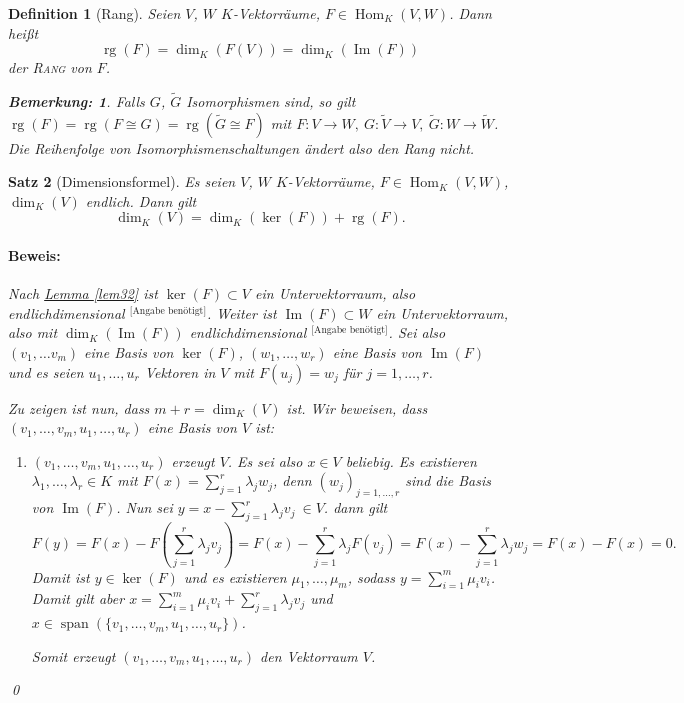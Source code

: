 \documentclass{report}
\newcommand{\IN}[1]{\index{#1|BH}}
\newcommand{\lb}{\lambda}
\DeclareMathOperator{\Span}{span}
\DeclareMathOperator{\Hom}{Hom}
\DeclareMathOperator{\Ima}{Im}
\DeclareMathOperator{\rg}{rg}
\theoremstyle{customrem}
\newtheorem*{bemerkung}{Bemerkung\textnormal:}
\theoremstyle{customdef}
\newtheorem{definition}{Definition}[chapter]
\newtheorem{satz}[definition]{Satz}
\renewenvironment{proof}{\paragraph{Beweis: }}{\qed}
\theoremstyle{customenv}
\newcommand{\defemph}[1]{\textsc{#1}}
\begin{document}
	\begin{definition}[Rang]
		\IN{Rang}
		Seien \(V\), \(W\) \(K\)-Vektorräume, \(F\in\Hom_K(V, W)\). Dann heißt \[\rg(F)=\dim_K(F(V)) = \dim_K(\Ima(F))\] der \defemph{Rang} von \(F\).\\
		\begin{bemerkung}
			Falls \(G\), \(\widetilde{G}\) Isomorphismen sind, so gilt \(\rg(F) = \rg(F\cong G) = \rg(\widetilde{G}\cong F)\) mit \(F:V\to W,\ G:\widetilde{V}\to V,\ \widetilde{G}: W\to\widetilde{W}\). Die Reihenfolge von Isomorphismenschaltungen ändert also den Rang nicht.\\
		\end{bemerkung}
	\end{definition}
	
	\begin{satz}[Dimensionsformel]
		\IN{Dimensionsformel}
		\label{satz37}
		Es seien \(V\), \(W\) \(K\)-Vektorräume, \(F\in\Hom_K(V, W)\), \(\dim_K(V)\) endlich. Dann gilt \[\dim_K(V) = \dim_K(\ker(F))+\rg(F).\]
		\begin{proof}
			Nach \hyperref[lem32]{Lemma \ref*{lem32}} ist \(\ker(F)\subset V\) ein Untervektorraum, also endlichdimensional \({}^\text{[Angabe benötigt]}\). Weiter ist \(\Ima(F)\subset W\) ein Untervektorraum, also mit \(\dim_K(\Ima(F))\) endlichdimensional \({}^\text{[Angabe benötigt]}\). Sei also \((v_1, \ldots v_m)\) eine Basis von \(\ker(F)\), \((w_1,\ldots, w_r)\) eine Basis von \(\Ima(F)\) und es seien \(u_1,\ldots, u_r\) Vektoren in \(V\) mit \(F(u_j)=w_j\) für \(j=1, \ldots, r\).
			
			Zu zeigen ist nun, dass \(m+r=\dim_K(V)\) ist. Wir beweisen, dass \((v_1, \ldots, v_m, u_1, \ldots, u_r)\) eine Basis von \(V\) ist:
			\begin{enumerate}
				\item \((v_1, \ldots, v_m, u_1, \ldots, u_r)\) erzeugt \(V\). Es sei also \(x\in V\) beliebig. Es existieren \(\lb_1, \ldots, \lb_r\in K\) mit \(F(x) = \sum_{j=1}^{r}\lb_j w_j\), denn \((w_j)_{j=1, \ldots, r}\) sind die Basis von \(\Ima(F)\). Nun sei \(y=x-\sum_{j=1}^{r}\lb_j v_j\ \in V\). dann gilt \[F(y) = F(x) - F\left(\sum_{j=1}^{r}\lb_j v_j\right) = F(x) - \sum_{j=1}^{r}\lb_j F(v_j)= F(x) - \sum_{j=1}^{r}\lb_j w_j = F(x)-F(x)=0.\] Damit ist \(y\in \ker(F)\) und es existieren \(\mu_1, \ldots, \mu_m\), sodass \(y=\sum_{i=1}^{m}\mu_i v_i\). Damit gilt aber \(x=\sum_{i=1}^{m}\mu_iv_i + \sum_{j=1}^{r}\lb_jv_j\) und \(x\in \Span(\{v_1, \ldots, v_m, u_1, \ldots, u_r\})\). 
				
				Somit erzeugt \((v_1, \ldots, v_m, u_1, \ldots, u_r)\) den Vektorraum \(V\).
				

\end{enumerate}
\end{proof}
\end{satz}
\end{document}
